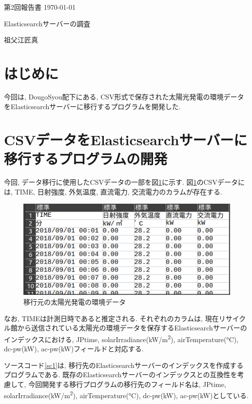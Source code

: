 \documentclass[a4j,12pt,]{jarticle}
\begin{document}
{\noindent\small 第2回報告書 \hfill\today}
\begin{center}
  {\Large Elasticsearchサーバーの調査}
\end{center}
\begin{flushright}
  祖父江匠真 \\
\end{flushright}

\section{はじめに}
今回は, DougoSyou配下にある, CSV形式で保存された太陽光発電の環境データをElasticsearchサーバーに移行するプログラムを開発した.

\section{CSVデータをElasticsearchサーバーに移行するプログラムの開発}
今回, データ移行に使用したCSVデータの一部を図\ref{p1}に示す.
図\ref{p1}のCSVデータには, TIME, 日射強度, 外気温度, 直流電力, 交流電力のカラムが存在する.

\begin{figure}[H]
  \begin{center}
    \includegraphics[width=160mm]{csv.png}
    \caption{移行元の太陽光発電の環境データ}
    \label{p1}
  \end{center}
\end{figure}

なお, TIMEは計測日時であると推定される.
それぞれのカラムは, 現在リサイクル館から送信されている太陽光の環境データを保存するElasticsearchサーバーのインデックスにおける, JPtime, solarIrradiance(\si{\kilo\watt}/\si{\metre\squared}), airTemperature(\si{\degreeCelsius}), dc-pw(\si{\kilo\watt}), ac-pw(\si{\kilo\watt})フィールドと対応する.

ソースコード\ref{sc1}は, 移行先のElasticsearchサーバーのインデックスを作成するプログラムである.
既存のElasticsearchサーバーのインデックスとの互換性を考慮して, 今回開発する移行プログラムの移行先のフィールド名は, JPtime, solarIrradiance(\si{\kilo\watt}/\si{\metre\squared}), airTemperature(\si{\degreeCelsius}), dc-pw(\si{\kilo\watt}), ac-pw(\si{\kilo\watt})としている.
\end{document}
